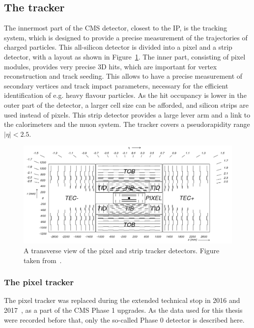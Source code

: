 \subsection{The tracker}

The innermost part of the \ac{CMS} detector, closest to the \ac{IP}, is the tracking system, which is designed to provide a precise measurement of the trajectories of charged particles. This all-silicon detector is divided into a pixel and a strip detector, with a layout as shown in Figure~\ref{fig:cmstracker}. The inner part, consisting of pixel modules, provides very precise 3D hits, which are important for vertex reconstruction and track seeding. This allows to have a precise measurement of secondary vertices and track impact parameters, necessary for the efficient identification of e.g. heavy flavour particles. As the hit occupancy is lower in the outer part of the detector, a larger cell size can be afforded, and silicon strips are used instead of pixels. This strip detector provides a large lever arm and a link to the calorimeters and the muon system. The tracker covers a pseudorapidity range $|\eta| < 2.5$.

\begin{figure}[ht]
  \centering
 \includegraphics[width=.9\textwidth]{fig_cmstracker}
 \caption{A transverse view of the pixel and strip tracker detectors. Figure taken from~\cite{Chatrchyan:2008aa}.}
 \label{fig:cmstracker}
\end{figure}

\subsubsection{The pixel tracker} 

The pixel tracker was replaced during the extended technical stop in 2016 and 2017~\cite{CMS:2012sda}, as a part of the \ac{CMS} Phase 1 upgrades. As the data used for this thesis were recorded before that, only the so-called Phase 0 detector is described here. 

